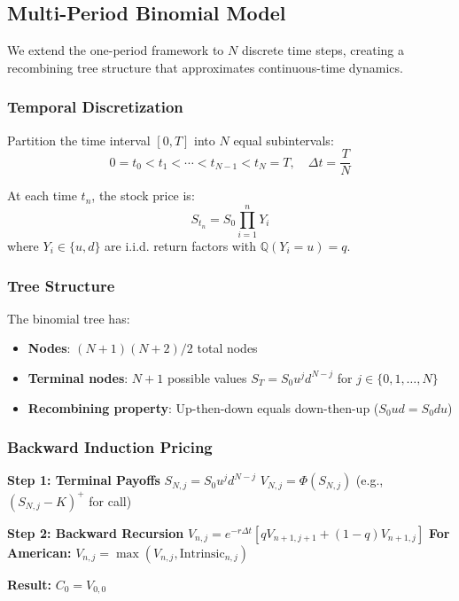 \documentclass[10pt,twocolumn]{article}
\begin{document}
\subsection{Multi-Period Binomial Model}

We extend the one-period framework to $N$ discrete time steps, creating a recombining tree structure that approximates continuous-time dynamics.

\subsubsection{Temporal Discretization}

Partition the time interval $[0, T]$ into $N$ equal subintervals:
\begin{equation}
0 = t_0 < t_1 < \cdots < t_{N-1} < t_N = T, \quad \Delta t = \frac{T}{N}
\end{equation}

At each time $t_n$, the stock price is:
\begin{equation}
S_{t_n} = S_0 \prod_{i=1}^{n} Y_i
\end{equation}
where $Y_i \in \{u, d\}$ are i.i.d. return factors with $\mathbb{Q}(Y_i = u) = q$.

\subsubsection{Tree Structure}

The binomial tree has:
\begin{itemize}[itemsep=2pt]
    \item \textbf{Nodes}: $(N+1)(N+2)/2$ total nodes
    \item \textbf{Terminal nodes}: $N+1$ possible values $S_T = S_0 u^j d^{N-j}$ for $j \in \{0, 1, \ldots, N\}$
    \item \textbf{Recombining property}: Up-then-down equals down-then-up ($S_0 ud = S_0 du$)
\end{itemize}

\subsubsection{Backward Induction Pricing}

\begin{algorithm}[H]
\caption{Multi-Period Binomial Pricing}
\begin{algorithmic}[1]
\STATE \textbf{Step 1: Terminal Payoffs}
    \STATE $S_{N,j} = S_0 u^j d^{N-j}$
    \STATE $V_{N,j} = \Phi(S_{N,j})$ \quad (e.g., $(S_{N,j} - K)^+$ for call)
\ENDFOR

\STATE \textbf{Step 2: Backward Recursion}
        \STATE $V_{n,j} = e^{-r\Delta t}[qV_{n+1,j+1} + (1-q)V_{n+1,j}]$
        \STATE \textbf{For American:} $V_{n,j} = \max(V_{n,j}, \text{Intrinsic}_{n,j})$
    \ENDFOR
\ENDFOR

\STATE \textbf{Result:} $C_0 = V_{0,0}$
\end{algorithmic}
\end{algorithm}
\end{document}
